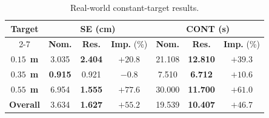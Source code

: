 \documentclass[letterpaper, 10 pt, conference]{ieeeconf}  %
\begin{document}
\begin{table}[t]
    \caption{Real-world constant-target results.}
    \label{tab:real_world_constant_tracking}
    \centering
    {\renewcommand{\arraystretch}{1.2}
    \begin{tabular}{|c|ccc|ccc|}
        \hline
        \multirow{2}{*}{\textbf{Target}} &
        \multicolumn{3}{c|}{\textbf{SE} (cm)} &
        \multicolumn{3}{c|}{\textbf{CONT} (s)} \\
        \cline{2-7}
        & \textbf{Nom.} & \textbf{Res.} & \textbf{Imp.} (\%)
        & \textbf{Nom.} & \textbf{Res.} & \textbf{Imp.} (\%) \\
        \hline
        $\mathbf{0.15}$~\textbf{m} & 3.035 & \textbf{2.404} & \textbf{$+20.8$}
        & 21.108 & \textbf{12.810} & \textbf{$+39.3$} \\
        $\mathbf{0.35}$~\textbf{m} & \textbf{0.915} & 0.921 & $-0.8$
        & 7.510 & \textbf{6.712} & \textbf{$+10.6$} \\
        $\mathbf{0.55}$~\textbf{m} & 6.954 & \textbf{1.555} & \textbf{$+77.6$}
        & 30.000 & \textbf{11.700} & \textbf{$+61.0$} \\
        \hline
        \textbf{Overall} & 3.634 & \textbf{1.627} & \textbf{$+55.2$}
        & 19.539 & \textbf{10.407} & \textbf{$+46.7$} \\
        \hline
    \end{tabular}}
\end{table}
\end{document}

